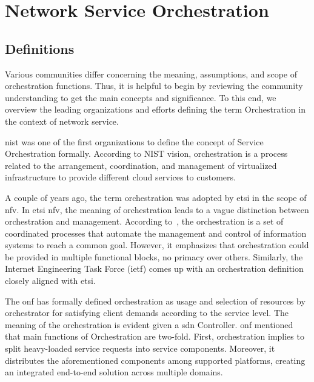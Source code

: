 \section{Network Service Orchestration}
\label{sec:nso}

\subsection{Definitions}%
\label{sec:orchdef}

Various communities differ concerning the meaning, assumptions, and scope of orchestration functions. Thus, it is helpful to begin by reviewing the community understanding to get the main concepts and significance. To this end, we overview the leading organizations and efforts defining the term Orchestration in the context of network service.



\gls{nist} \cite{Bohn2011NISTArchitecture} was one of the first organizations to define the concept of Service Orchestration formally. According to NIST vision, orchestration is a process related to the arrangement, coordination, and management of virtualized infrastructure to provide different cloud services to customers.

A couple of years ago, the term orchestration was adopted by \gls{etsi} in the scope of \gls{nfv}. In \gls{etsi} \gls{nfv}, the meaning of orchestration leads to a vague distinction between orchestration and management. According to~\cite{ETSIISG2018}, the orchestration is a set of coordinated processes that automate the management and control of information systems to reach a common goal. However, it emphasizes that orchestration could be provided in multiple functional blocks, no primacy over others. Similarly, the Internet Engineering Task Force (\gls{ietf}) comes up with an orchestration definition closely aligned with \gls{etsi}. 

The \gls{onf} \cite{OpenNetworkingFoundation2016FrameworkNetworks} has formally defined orchestration as usage and selection of resources by orchestrator for satisfying client demands according to the service level. The meaning of the orchestration is evident given a \gls{sdn} Controller. \gls{onf} mentioned that main functions of Orchestration are two-fold. First, orchestration implies to split heavy-loaded service requests into service components. Moreover, it distributes the aforementioned components among supported platforms, creating an integrated end-to-end solution across multiple domains.

